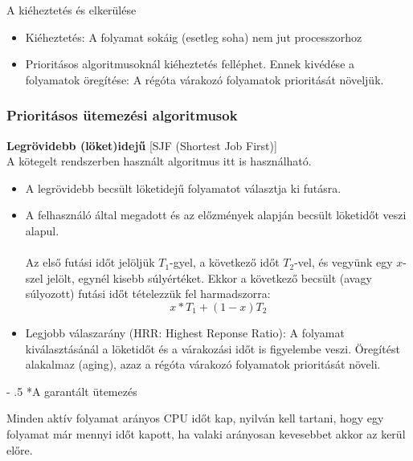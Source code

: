 \documentclass[tikz,12pt,margin=0px]{article}
\makeatletter
\renewcommand\paragraph{%
	\@startsection{paragraph}{4}{0mm}%
	{-\baselineskip}%
	{.5\baselineskip}%
	{\normalfont\normalsize\bfseries}}
\makeatother
\begin{document}
    \noindent A kiéheztetés és elkerülése
    \begin{itemize}[topsep=8pt,itemsep=4pt,partopsep=4pt, parsep=4pt]
      \item Kiéheztetés: A folyamat sokáig (esetleg soha) nem jut processzorhoz
      \item Prioritásos algoritmusoknál kiéheztetés felléphet. Ennek kivédése a folyamatok öregítése: A régóta várakozó folyamatok prioritását növeljük.\\
    \end{itemize}

    \subsubsection*{Prioritásos ütemezési algoritmusok\\}

    \noindent \textbf{Legrövidebb (löket)idejű} [SJF (Shortest Job First)]\\

    \noindent A kötegelt rendszerben használt algoritmus itt is használható.

    \begin{itemize}[topsep=8pt,itemsep=4pt,partopsep=4pt, parsep=4pt]
        \item A legrövidebb becsült löketidejű folyamatot választja ki futásra.
        \item A felhasználó által megadott és az előzmények alapján becsült löketidőt veszi alapul.\\\\
        Az első futási időt jelöljük $T_1$-gyel, a következő időt $T_2$-vel, és vegyünk egy $x$-szel jelölt, egynél kisebb súlyértéket. Ekkor a következő becsült (avagy súlyozott) futási időt tételezzük fel harmadszorra:
        \[
            x * T_{1} + (1 - x)T_{2}
        \]
        \item Legjobb válaszarány (HRR: Highest Reponse Ratio): A folyamat kiválasztásánál a löketidőt és a várakozási időt is figyelembe veszi. Öregítést alakalmaz (aging), azaz a régóta várakozó folyamatok prioritását növeli.\\
    \end{itemize}

    \paragraph*{A garantált ütemezés}

    \noindent Minden aktív folyamat arányos CPU időt kap, nyilván kell tartani, hogy egy folyamat már mennyi időt kapott, ha valaki arányosan kevesebbet akkor az kerül előre.
\end{document}

